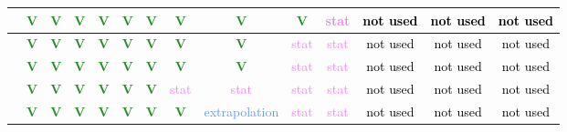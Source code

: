 \begin{frame}
{\begin{tabular}{|c||*{13}{c|}}
\hline
[283-344] & \textcolor{ForestGreen}{\textbf{V}} & \textcolor{ForestGreen}{\textbf{V}} & \textcolor{ForestGreen}{\textbf{V}} & \textcolor{ForestGreen}{\textbf{V}} & \textcolor{ForestGreen}{\textbf{V}} & \textcolor{ForestGreen}{\textbf{V}} & \textcolor{ForestGreen}{\textbf{V}} & \textcolor{ForestGreen}{\textbf{V}} & \textcolor{ForestGreen}{\textbf{V}} & \textcolor{violet}{stat} & \textcolor{black}{not used} & \textcolor{black}{not used} & \textcolor{black}{not used} \\
\hline
[344-443] & \textcolor{ForestGreen}{\textbf{V}} & \textcolor{ForestGreen}{\textbf{V}} & \textcolor{ForestGreen}{\textbf{V}} & \textcolor{ForestGreen}{\textbf{V}} & \textcolor{ForestGreen}{\textbf{V}} & \textcolor{ForestGreen}{\textbf{V}} & \textcolor{ForestGreen}{\textbf{V}} & \textcolor{ForestGreen}{\textbf{V}} & \textcolor{violet}{stat} & \textcolor{violet}{stat} & \textcolor{black}{not used} & \textcolor{black}{not used} & \textcolor{black}{not used} \\
\hline
[443-577] & \textcolor{ForestGreen}{\textbf{V}} & \textcolor{ForestGreen}{\textbf{V}} & \textcolor{ForestGreen}{\textbf{V}} & \textcolor{ForestGreen}{\textbf{V}} & \textcolor{ForestGreen}{\textbf{V}} & \textcolor{ForestGreen}{\textbf{V}} & \textcolor{ForestGreen}{\textbf{V}} & \textcolor{ForestGreen}{\textbf{V}} & \textcolor{violet}{stat} & \textcolor{violet}{stat} & \textcolor{black}{not used} & \textcolor{black}{not used} & \textcolor{black}{not used} \\
\hline
[577-606] & \textcolor{ForestGreen}{\textbf{V}} & \textcolor{ForestGreen}{\textbf{V}} & \textcolor{ForestGreen}{\textbf{V}} & \textcolor{ForestGreen}{\textbf{V}} & \textcolor{ForestGreen}{\textbf{V}} & \textcolor{ForestGreen}{\textbf{V}} & \textcolor{violet}{stat} & \textcolor{violet}{stat} & \textcolor{violet}{stat} & \textcolor{violet}{stat} & \textcolor{black}{not used} & \textcolor{black}{not used} & \textcolor{black}{not used} \\
\hline
[606-1500] & \textcolor{ForestGreen}{\textbf{V}} & \textcolor{ForestGreen}{\textbf{V}} & \textcolor{ForestGreen}{\textbf{V}} & \textcolor{ForestGreen}{\textbf{V}} & \textcolor{ForestGreen}{\textbf{V}} & \textcolor{ForestGreen}{\textbf{V}} & \textcolor{ForestGreen}{\textbf{V}} & \textcolor{CornflowerBlue}{extrapolation} & \textcolor{violet}{stat} & \textcolor{violet}{stat} & \textcolor{black}{not used} & \textcolor{black}{not used} & \textcolor{black}{not used} \\
\hline
\end{tabular}
}
\vspace{0.5cm}


\end{frame}
